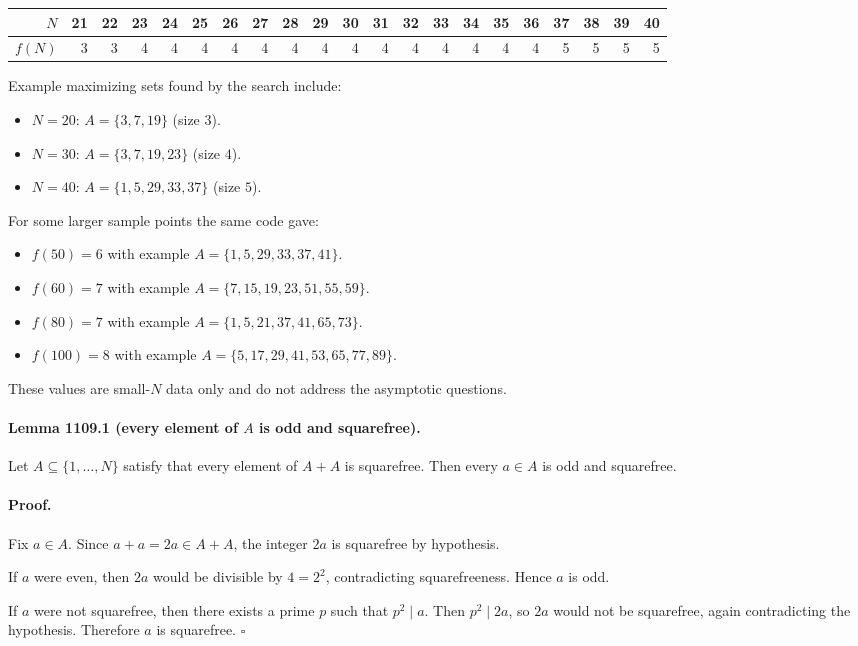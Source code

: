 \begin{center}
\begin{tabular}{r|rrrrrrrrrrrrrrrrrrrr}
$N$ &21&22&23&24&25&26&27&28&29&30&31&32&33&34&35&36&37&38&39&40\\\hline
$f(N)$&3&3&4&4&4&4&4&4&4&4&4&4&4&4&4&4&5&5&5&5
\end{tabular}
\end{center}

Example maximizing sets found by the search include:
\begin{itemize}
\item $N=20$: $A=\{3,7,19\}$ (size $3$).
\item $N=30$: $A=\{3,7,19,23\}$ (size $4$).
\item $N=40$: $A=\{1,5,29,33,37\}$ (size $5$).
\end{itemize}
For some larger sample points the same code gave:
\begin{itemize}
\item $f(50)=6$ with example $A=\{1,5,29,33,37,41\}$.
\item $f(60)=7$ with example $A=\{7,15,19,23,51,55,59\}$.
\item $f(80)=7$ with example $A=\{1,5,21,37,41,65,73\}$.
\item $f(100)=8$ with example $A=\{5,17,29,41,53,65,77,89\}$.
\end{itemize}
These values are small-$N$ data only and do not address the asymptotic questions.

\paragraph{Lemma 1109.1 (every element of $A$ is odd and squarefree).}
Let $A\subseteq\{1,\dots,N\}$ satisfy that every element of $A+A$ is squarefree.
Then every $a\in A$ is odd and squarefree.

\paragraph{Proof.}
Fix $a\in A$. Since $a+a=2a\in A+A$, the integer $2a$ is squarefree by hypothesis.

If $a$ were even, then $2a$ would be divisible by $4=2^2$, contradicting squarefreeness. Hence $a$ is odd.

If $a$ were not squarefree, then there exists a prime $p$ such that $p^2\mid a$.
Then $p^2\mid 2a$, so $2a$ would not be squarefree, again contradicting the hypothesis.
Therefore $a$ is squarefree. \hfill $\square$

